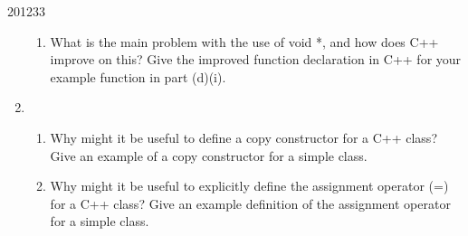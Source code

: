 \documentclass[10pt,\jkfside,a4paper]{article}
\begin{document}
\begin{examquestion}{2012}{3}{3}
\begin{enumerate}[label=(alph*)]
\begin{enumerate}[label=(\roman*)]

\item What is the main problem with the use of void *, and how does C++
improve on this? Give the improved function declaration in C++ for your
example function in part (d)(i).


\end{enumerate}

\item

\begin{enumerate}[label=(\roman*)]

\item Why might it be useful to define a copy constructor for a C++ class?
Give an example of a copy constructor for a simple class.


\item Why might it be useful to explicitly define the assignment operator
(=) for a C++ class? Give an example definition of the assignment operator
for a simple class.


\end{enumerate}

\end{enumerate}

\end{examquestion}
\end{document}
